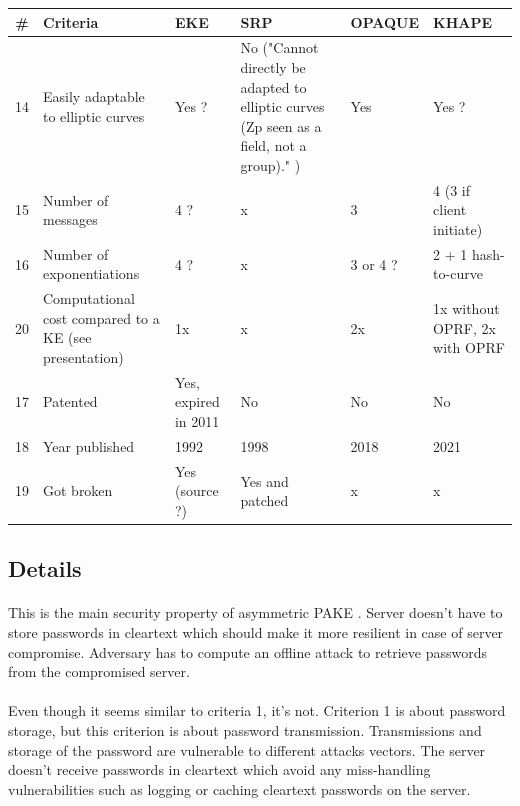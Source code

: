 \documentclass[../report.tex]{subfiles}
\begin{document}
\begin{center}
   \begin{tabular}{ | c | p{6cm} || p{2cm} | p{1cm} | p{2cm} | p{2cm} | }
     \hline
     \textbf{\#} & \textbf{Criteria} & \textbf{EKE} & \textbf{SRP} & \textbf{OPAQUE} & \textbf{KHAPE} \\ \hline
     
     14 & Easily adaptable to elliptic curves & Yes ? & No ("Cannot directly be adapted to elliptic curves (Zp seen as a field, not a group)." \cite{CAA}) & Yes & Yes ? \\ \hline
     15 & Number of messages & 4 ? & x & 3 & 4 (3 if client initiate) \\ \hline
     16 & Number of exponentiations & 4 ? & x & 3 or 4 ? & 2 + 1 hash-to-curve \\ \hline
     20 & Computational cost compared to a KE (see \cite{KHAPE_Paper} presentation) & 1x & x & 2x & 1x without OPRF, 2x with OPRF \\ \hline
     17 & Patented & Yes, expired in 2011 & No & No & No \\ \hline
     18 & Year published & 1992 & 1998 & 2018 & 2021 \\ \hline
     19 & Got broken & Yes (source ?) & Yes and patched \cite{CAA} & x & x \\ \hline

     \end{tabular}
 \end{center}
 
\subsection{Details} \label{sec:comparison_details}



\paragraph{}
This is the main security property of asymmetric PAKE \cite{aPAKE_Formalized}. Server doesn't have to store passwords in cleartext which should make it more resilient in case of server compromise. Adversary has to compute an offline attack to retrieve passwords from the compromised server.

\paragraph{}
Even though it seems similar to criteria 1, it's not. Criterion 1 is about password storage, but this criterion is about password transmission. Transmissions and storage of the password are vulnerable to different attacks vectors.
The server doesn't receive passwords in cleartext which avoid any miss-handling vulnerabilities such as logging or caching cleartext passwords on the server.
\end{document}
